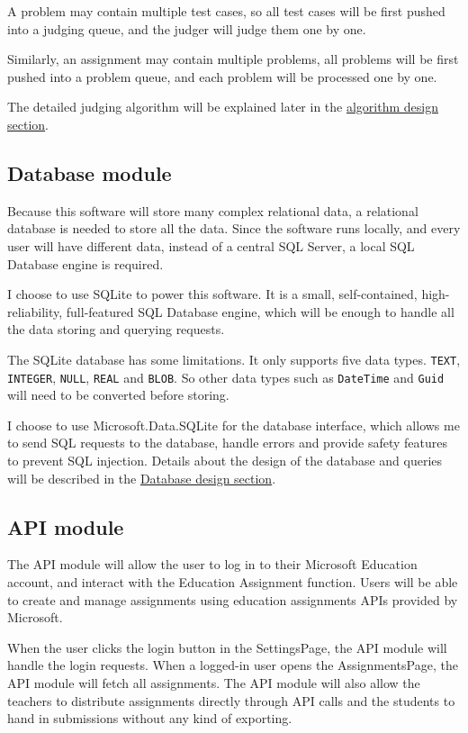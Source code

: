 \documentclass[a4paper]{report}
\newcommand{\code}{\texttt}
\begin{document}
A problem may contain multiple test cases, so all test cases will be first pushed into a judging queue, and the judger will judge them one by one.

Similarly, an assignment may contain multiple problems, all problems will be first pushed into a problem queue, and each problem will be processed one by one.

The detailed judging algorithm will be explained later in the 
\hyperref[sec:algorithm design]{algorithm design section}.

\subsection{Database module}

Because this software will store many complex relational data, a relational database is needed to store all the data. Since the software runs locally, and every user will have different data, instead of a central SQL Server, a local SQL Database engine is required.

I choose to use SQLite to power this software. It is a small, self-contained, high-reliability, full-featured SQL Database engine, which will be enough to handle all the data storing and querying requests.

The SQLite database has some limitations. It only supports five data types. \code{TEXT}, \code{INTEGER}, \code{NULL}, \code{REAL} and \code{BLOB}. So other data types such as \code{DateTime} and \code{Guid} will need to be converted before storing.

I choose to use Microsoft.Data.SQLite for the database interface, which allows me to send SQL requests to the database, handle errors and provide safety features to prevent SQL injection. Details about the design of the database and queries will be described in the \hyperref[subsec:database design]{Database design section}.

\subsection{API module}

The API module will allow the user to log in to their Microsoft Education account, and interact with the Education Assignment function. Users will be able to create and manage assignments using education assignments APIs provided by Microsoft.

When the user clicks the login button in the SettingsPage, the API module will handle the login requests. When a logged-in user opens the AssignmentsPage, the API module will fetch all assignments. The API module will also allow the teachers to distribute assignments directly through API calls and the students to hand in submissions without any kind of exporting.
\end{document}
